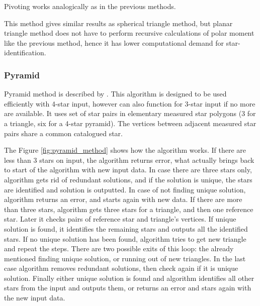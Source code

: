 \documentclass[12pt,a4paper,oneside]{article}
\begin{document}
Pivoting works analogically as in the previous methods.

This method gives similar results as spherical triangle method, but planar triangle method does not have to perform recursive calculations of polar moment like the previous method, hence it has lower computational demand for star-identification\cite{alidoost2013review}.	


\subsubsection{Pyramid}

Pyramid method is described by \citet{mortari2004pyramid}. This algorithm is designed to be used efficiently with 4-star input, however can also function for 3-star input if no more are available. It uses set of star pairs in elementary measured star polygons (3 for a triangle, six for a 4-star pyramid). The vertices between adjacent measured star pairs share a common catalogued star.

The Figure \ref{fig:pyramid_method} shows how the algorithm works. If there are less than 3 stars on input, the algorithm returns error, what actually brings back to start of the algorithm with new input data. In case there are three stars only, algorithm gets rid of redundant solutions, and if the solution is unique, the stars are identified and solution is outputted. In case of not finding unique solution, algorithm returns an error, and starts again with new data. If there are more than three stars, algorithm gets three stars for a triangle, and then one reference star. Later it checks pairs of reference star and triangle's vertices. If unique solution is found, it identifies the remaining stars and outputs all the identified stars. If no unique solution has been found, algorithm tries to get new triangle and repeat the steps. There are two possible exits of this loop: the already mentioned finding unique solution, or running out of new triangles. In the last case algorithm removes redundant solutions, then check again if it is unique solution. Finally either unique solution is found and algorithm identifies all other stars from the input and outputs them, or returns an error and stars again with the new input data.
\end{document}

